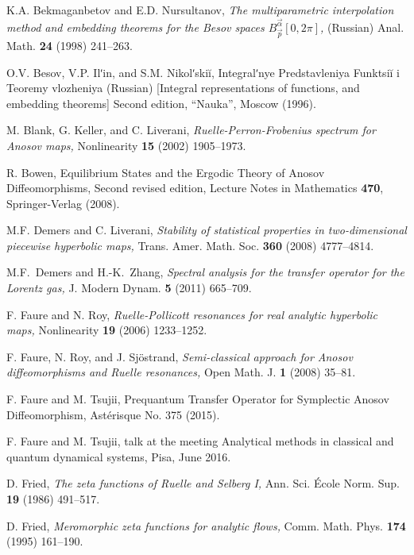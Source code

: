 \documentclass[10pt,twoside]{amsart}
\begin{document}
\begin{thebibliography}{KKPW}
 K.A. Bekmaganbetov and E.D.  Nursultanov, {\it The multiparametric interpolation method and embedding theorems for the Besov spaces $B^{\vec \alpha}_{\vec p} [0,2\pi]$,} (Russian) Anal. Math. \textbf{24} (1998) 241--263.



 O.V. Besov, V.P. Ilʹin, and S.M.  Nikolʹski\u{i}, 
Integralʹnye Predstavleniya Funktsi\u{i} i Teoremy vlozheniya (Russian) [Integral representations of functions, and embedding theorems]
Second edition, ``Nauka'', Moscow (1996).

M. Blank, G. Keller, and C. Liverani,
{\it Ruelle-{P}erron-{F}robenius spectrum for {A}nosov maps,}
 Nonlinearity \textbf{15} (2002) 1905--1973.


 R. Bowen, 
Equilibrium States and the Ergodic Theory of Anosov Diffeomorphisms,
Second revised edition, Lecture Notes in Mathematics \textbf{470}, Springer-Verlag (2008).

M.F. Demers and C. Liverani, 
{\it Stability of statistical properties in two-dimensional  piecewise hyperbolic maps,}
 Trans. Amer. Math. Soc. \textbf{360} (2008) 4777--4814.

 M.F.~Demers and H.-K.~Zhang, {\it Spectral analysis
  for the transfer operator for the Lorentz gas,} J. Modern Dynam. {\bf 5} (2011) 665--709.

 F. Faure and N.   Roy, 
{\it Ruelle-Pollicott resonances for real analytic hyperbolic maps,}
Nonlinearity \textbf {19} (2006)  1233--1252.

 F. Faure, N. Roy, and J. Sj\"ostrand,  
{\it Semi-classical approach for Anosov diffeomorphisms and Ruelle resonances,}  Open Math. J.  \textbf{1} (2008) 35--81.


 
  F. Faure and M. Tsujii,   Prequantum Transfer Operator for Symplectic Anosov Diffeomorphism,   Ast\'erisque No. 375 (2015).
 
  F. Faure and M. Tsujii, talk at the meeting
 Analytical methods in classical and quantum dynamical systems, Pisa, June 2016.
 
 
D. Fried, 
{\it The zeta functions of Ruelle and Selberg I,}
Ann. Sci. \'Ecole Norm. Sup. 
\textbf{19} (1986) 491--517.



D. Fried, 
{\it Meromorphic zeta functions for analytic flows,}
Comm. Math. Phys. \textbf{174} (1995)
161--190.
 

\end{thebibliography}
\end{document}
